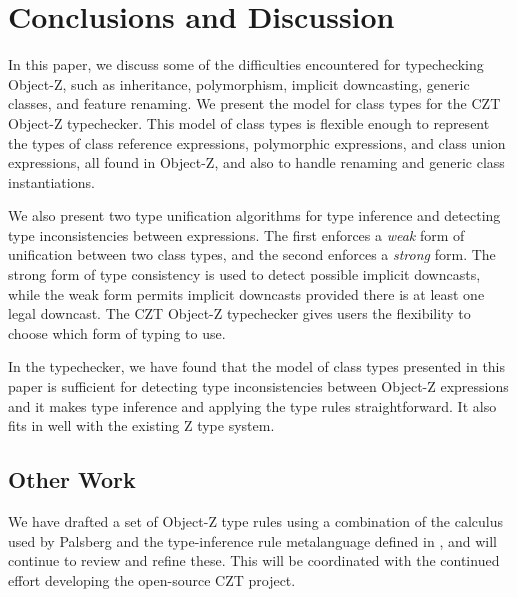 \section{Conclusions and Discussion}

In this paper, we discuss some of the difficulties encountered for
typechecking Object-Z, such as inheritance, polymorphism, implicit
downcasting, generic classes, and feature renaming. We present the
model for class types for the CZT Object-Z typechecker. This model of
class types is flexible enough to represent the types of class
reference expressions, polymorphic expressions, and class union
expressions, all found in Object-Z, and also to handle renaming and
generic class instantiations.

We also present two type unification algorithms for type inference and
detecting type inconsistencies between expressions. The first enforces
a {\em weak} form of unification between two class types, and the
second enforces a {\em strong} form. The strong form of type
consistency is used to detect possible implicit downcasts, while the
weak form permits implicit downcasts provided there is at least one
legal downcast. The CZT Object-Z typechecker gives users the
flexibility to choose which form of typing to use.

In the typechecker, we have found that the model of class types
presented in this paper is sufficient for detecting type
inconsistencies between Object-Z expressions and it makes type
inference and applying the type rules straightforward. It also fits in
well with the existing Z type system.

\subsection{Other Work}

We have drafted a set of Object-Z type rules using a combination of
the calculus used by Palsberg \cite{palsberg95} and the type-inference
rule metalanguage defined in \theStandard \cite{isoz}, and will
continue to review and refine these. This will be coordinated with the
continued effort developing the open-source CZT project.
